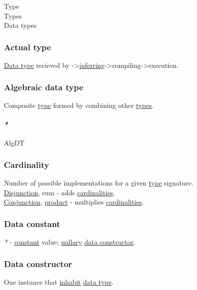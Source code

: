 \documentclass[11pt]{article}
\begin{document}
\label{org4fbaeb8}Type\\
\label{org3927fd9}Types\\
\label{org88981ee}Data types\\

\subsubsection{\label{org881c28e}Actual type}
\label{sec:orgfaf2bf6}
\hyperref[org965cde3]{Data type} recieved by ->\hyperref[org0225832]{inferring}->compiling->execution.\\

\subsubsection{\label{orgeba275a}Algebraic data type}
\label{sec:orga4a4387}
Composite \hyperref[org4fbaeb8]{type} formed by combining other \hyperref[org3927fd9]{types}.\\

\paragraph{\emph{*}}
\label{sec:org7239f25}

\label{org52927fe}AlgDT\\

\subsubsection{\label{orgd81825c}Cardinality}
\label{sec:orgbe04cdc}
Number of possible implementations for a given \hyperref[org4fbaeb8]{type} signature.\\

\hyperref[org29ff7d6]{Disjunction}, sum - adds \hyperref[org54cdea2]{cardinalities}.\\
\hyperref[org19fd1b3]{Conjunction}, \hyperref[orga3d1454]{product} - multiplies \hyperref[org54cdea2]{cardinalities}.\\

\subsubsection{\label{org8029be1}Data constant}
\label{sec:orgf45ab8c}
\emph{*} - \hyperref[org6cc4f99]{constant} value; \hyperref[org0fa472a]{nullary} \hyperref[org6dad980]{data constructor}.\\

\subsubsection{\label{org6dad980}Data constructor}
\label{sec:orge402703}
One instance that \hyperref[org57e1f17]{inhabit} \hyperref[org965cde3]{data type}.\\
\end{document}
